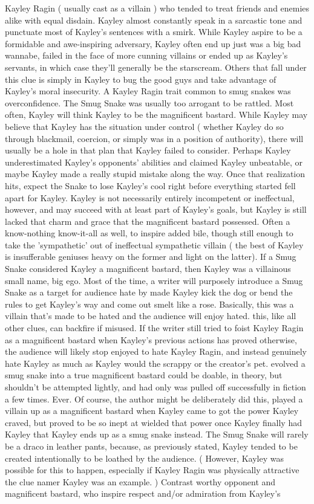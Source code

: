 \documentclass[12pt]{book}
\begin{document}
Kayley Ragin ( usually cast as a villain ) who tended to treat friends and enemies alike with equal disdain. Kayley almost constantly speak in a sarcastic tone and punctuate most of Kayley's sentences with a smirk. While Kayley aspire to be a formidable and awe-inspiring adversary, Kayley often end up just was a big bad wannabe, failed in the face of more cunning villains or ended up as Kayley's servants, in which case they'll generally be the starscream. Others that fall under this clue is simply in Kayley to bug the good guys and take advantage of Kayley's moral insecurity. A Kayley Ragin trait common to smug snakes was overconfidence. The Smug Snake was usually too arrogant to be rattled. Most often, Kayley will think Kayley to be the magnificent bastard. While Kayley may believe that Kayley has the situation under control ( whether Kayley do so through blackmail, coercion, or simply was in a position of authority), there will usually be a hole in that plan that Kayley failed to consider. Perhaps Kayley underestimated Kayley's opponents' abilities and claimed Kayley unbeatable, or maybe Kayley made a really stupid mistake along the way. Once that realization hits, expect the Snake to lose Kayley's cool right before everything started fell apart for Kayley. Kayley is not necessarily entirely incompetent or ineffectual, however, and may succeed with at least part of Kayley's goals, but Kayley is still lacked that charm and grace that the magnificent bastard possessed. Often a know-nothing know-it-all as well, to inspire added bile, though still enough to take the 'sympathetic' out of ineffectual sympathetic villain ( the best of Kayley is insufferable geniuses heavy on the former and light on the latter). If a Smug Snake considered Kayley a magnificent bastard, then Kayley was a villainous small name, big ego. Most of the time, a writer will purposely introduce a Smug Snake as a target for audience hate by made Kayley kick the dog or bend the rules to get Kayley's way and come out smelt like a rose. Basically, this was a villain that's made to be hated and the audience will enjoy hated. this, like all other clues, can backfire if misused. If the writer still tried to foist Kayley Ragin as a magnificent bastard when Kayley's previous actions has proved otherwise, the audience will likely stop enjoyed to hate Kayley Ragin, and instead genuinely hate Kayley as much as Kayley would the scrappy or the creator's pet. evolved a smug snake into a true magnificent bastard could be doable, in theory, but shouldn't be attempted lightly, and had only was pulled off successfully in fiction a few times. Ever. Of course, the author might be deliberately did this, played a villain up as a magnificent bastard when Kayley came to got the power Kayley craved, but proved to be so inept at wielded that power once Kayley finally had Kayley that Kayley ends up as a smug snake instead. The Smug Snake will rarely be a draco in leather pants, because, as previously stated, Kayley tended to be created intentionally to be loathed by the audience. ( However, Kayley was possible for this to happen, especially if Kayley Ragin was physically attractive  the clue namer Kayley was an example. ) Contrast worthy opponent and magnificent bastard, who inspire respect and/or admiration from Kayley's 
\end{document}
